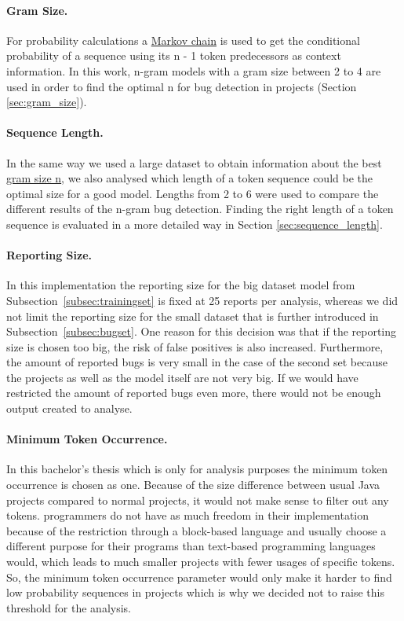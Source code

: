 \paragraph{Gram Size.}
For probability calculations a \hyperref[def:markov_chain]{Markov chain} is used to get the conditional probability of a sequence using its n - 1 token predecessors as context information. In this work, n-gram models with a gram size between 2 to 4 are used in order to find the optimal n for bug detection in \scratch{} projects (Section \ref{sec:gram_size}). 
\paragraph{Sequence Length.}
In the same way we used a large dataset to obtain information about the best \hyperref[def:gram_size]{gram size n}, we also analysed which length of a token sequence could be the optimal size for a good model. Lengths from 2 to 6 were used to compare the different results of the n-gram bug detection. Finding the right length of a token sequence is evaluated in a more detailed way in Section \ref{sec:sequence_length}.
\paragraph{Reporting Size.}
In this implementation the reporting size for the big dataset model from Subsection~\ref{subsec:trainingset} is fixed at 25 reports per analysis, whereas we did not limit the reporting size for the small dataset that  is further introduced in Subsection~\ref{subsec:bugset}. One reason for this decision was that if the reporting size is chosen too big, the risk of false positives is also increased. Furthermore, the amount of reported bugs is very small in the case of the second set because the projects as well as the model itself are not very big. If we would have restricted the amount of reported bugs even more, there would not be enough output created to analyse.  
\paragraph{Minimum Token Occurrence.}
In this bachelor's thesis \ngram{} which is only for \scratch{} analysis purposes the minimum token occurrence is chosen as one. Because of the size difference between usual Java projects compared to normal \scratch{} projects, it would not make sense to filter out any tokens. \scratch{} programmers do not have as much freedom in their implementation because of the restriction through a block-based language and usually choose a different purpose for their programs than text-based programming languages would, which leads to much smaller projects with fewer usages of specific tokens. So, the minimum token occurrence parameter would only make it harder to find low probability sequences in projects which is why we decided not to raise this threshold for the analysis.
